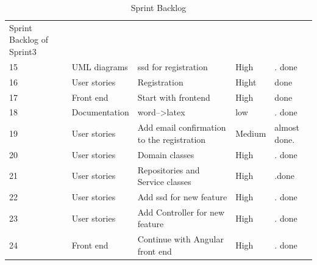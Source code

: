 \documentclass{scrartcl}
\begin{document}
\begin{table}[H]
\begin{center}
\begin{tabular}{| p{2.5cm}| p{4cm} | p{5cm} |p{2.5cm} | p{4cm}|}
                  Sprint Backlog of Sprint3 \\
                    15 & UML diagrams & ssd for registration  & High & .  done\\ \hline
                      16 & User stories & Registration & Hight &  done \\ \hline
                       17 & Front end & Start with frontend & High &   done \\ \hline
                        18 & Documentation & word-->latex & low & . done\\ \hline
                         19 & User stories & Add email confirmation to the registration & Medium & almost done. \\ \hline
                          20 & User stories & Domain classes & High & . done\\ \hline
                           21 & User stories & Repositories and Service classes & High & .done \\ \hline
                            22 & User stories & Add ssd for new feature  & High & . done\\ \hline
                            23 & User stories &  Add Controller for new feature & High & . done\\ \hline
          24 & Front end  & Continue with Angular front end  & High & . done\\ \hline
          
            \end{tabular}
    \end{center}
    \caption{Sprint Backlog}
    \label{tab:typo}
\end{table}
          
\end{document}
